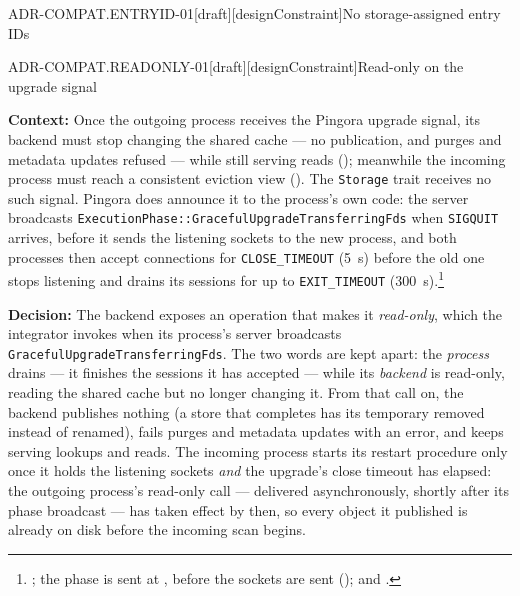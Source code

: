 \begin{requirement}{ADR-COMPAT.ENTRYID-01}[draft][designConstraint]{No storage-assigned entry IDs}


\end{requirement}

\begin{requirement}{ADR-COMPAT.READONLY-01}[draft][designConstraint]{Read-only on the upgrade signal}


  \textbf{Context:} Once the outgoing process receives the Pingora upgrade
  signal, its backend must stop changing the shared cache --- no
  publication, and purges and metadata updates refused --- while still
  serving reads (); meanwhile the incoming
  process must reach a consistent eviction view
  (). The \texttt{Storage} trait receives no
  such signal. Pingora does announce it to the process's own code: the
  server broadcasts \texttt{ExecutionPhase::GracefulUpgradeTransferringFds}
  when \texttt{SIGQUIT} arrives, before it sends the listening sockets to the
  new process, and both processes then accept connections for
  \texttt{CLOSE\_TIMEOUT} (5~s) before the old one stops listening and drains
  its sessions for up to \texttt{EXIT\_TIMEOUT} (300~s).\footnote{;
  the phase is sent at ,
  before the sockets are sent ();
   and
  .}

  \textbf{Decision:} The backend exposes an operation that makes it
  \emph{read-only}, which the integrator invokes when its process's server
  broadcasts \texttt{GracefulUpgradeTransferringFds}. The two words are kept
  apart: the \emph{process} drains --- it finishes the sessions it has
  accepted --- while its \emph{backend} is read-only, reading the shared
  cache but no longer changing it. From that call on, the backend
  publishes nothing (a store that completes has its temporary removed
  instead of renamed), fails purges and metadata updates with an error, and
  keeps serving lookups and reads. The incoming process starts its restart
  procedure only once it holds the listening sockets \emph{and} the
  upgrade's close timeout has elapsed: the outgoing process's read-only call ---
  delivered asynchronously, shortly after its phase broadcast --- has taken
  effect by then, so every object it published is already on disk before the
  incoming scan begins.


\end{requirement}
